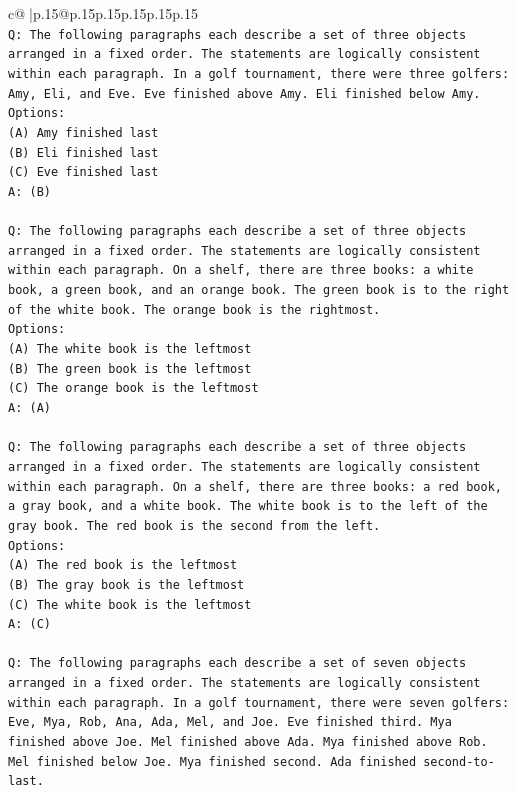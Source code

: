 \documentclass{article}
\begin{document}
{\begin{supertabular}{c@{$\;$}|p{.15\linewidth}@{}p{.15\linewidth}p{.15\linewidth}p{.15\linewidth}p{.15\linewidth}p{.15\linewidth}}
{{{\\ 
\texttt{Q: The following paragraphs each describe a set of three objects arranged in a fixed order. The statements are logically consistent within each paragraph. In a golf tournament, there were three golfers: Amy, Eli, and Eve. Eve finished above Amy. Eli finished below Amy.} \\
\texttt{Options:} \\
\texttt{(A) Amy finished last} \\
\texttt{(B) Eli finished last} \\
\texttt{(C) Eve finished last} \\
\texttt{A: (B)} \\
\\ 
\texttt{Q: The following paragraphs each describe a set of three objects arranged in a fixed order. The statements are logically consistent within each paragraph. On a shelf, there are three books: a white book, a green book, and an orange book. The green book is to the right of the white book. The orange book is the rightmost.} \\
\texttt{Options:} \\
\texttt{(A) The white book is the leftmost} \\
\texttt{(B) The green book is the leftmost} \\
\texttt{(C) The orange book is the leftmost} \\
\texttt{A: (A)} \\
\\ 
\texttt{Q: The following paragraphs each describe a set of three objects arranged in a fixed order. The statements are logically consistent within each paragraph. On a shelf, there are three books: a red book, a gray book, and a white book. The white book is to the left of the gray book. The red book is the second from the left.} \\
\texttt{Options:} \\
\texttt{(A) The red book is the leftmost} \\
\texttt{(B) The gray book is the leftmost} \\
\texttt{(C) The white book is the leftmost} \\
\texttt{A: (C)} \\
\\ 
\texttt{Q: The following paragraphs each describe a set of seven objects arranged in a fixed order. The statements are logically consistent within each paragraph. In a golf tournament, there were seven golfers: Eve, Mya, Rob, Ana, Ada, Mel, and Joe. Eve finished third. Mya finished above Joe. Mel finished above Ada. Mya finished above Rob. Mel finished below Joe. Mya finished second. Ada finished second{-}to{-}last.} \\
}}}
\end{supertabular}}
\end{document}
